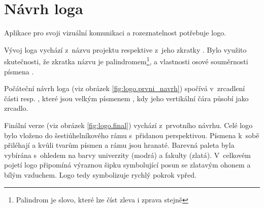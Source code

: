 \documentclass[czech,BP]{thesiskiv}
\begin{document}
	\section{Návrh loga}
	\par Aplikace pro svoji vizuální komunikaci a rozeznatelnost potřebuje logo.
	\par Vývoj loga vychází z~názvu projektu  respektive z~jeho zkratky . Bylo využito skutečnosti, že zkratka názvu je palindromem\footnote{Palindrom je slovo, které lze číst zleva i zprava stejně}, a vlastnosti osové souměrnosti písmena .
	\par Počáteční návrh loga (viz obrázek \ref{fig:logo.prvni_navrh}) spočívá v~zrcadlení části  resp. , které jsou  velkým písmenem , kdy jeho vertikální čára působí jako zrcadlo.
	\par Finální verze (viz obrázek \ref{fig:logo.final}) vychází z~prvotního návrhu. Celé logo bylo vloženo do šestiúhelníkového rámu s~přidanou perspektivou. Písmena k~sobě přiléhají a kvůli tvarům písmen a rámu jsou hranaté. Barevná paleta byla vybírána s~ohledem na barvy univerzity (modrá) a fakulty (zlatá). V~celkovém pojetí logo připomíná výraznou šipku symbolující posun se zlatavým ohonem a bílým vzduchem. Logo tedy symbolizuje rychlý pokrok vpřed.
\end{document}
